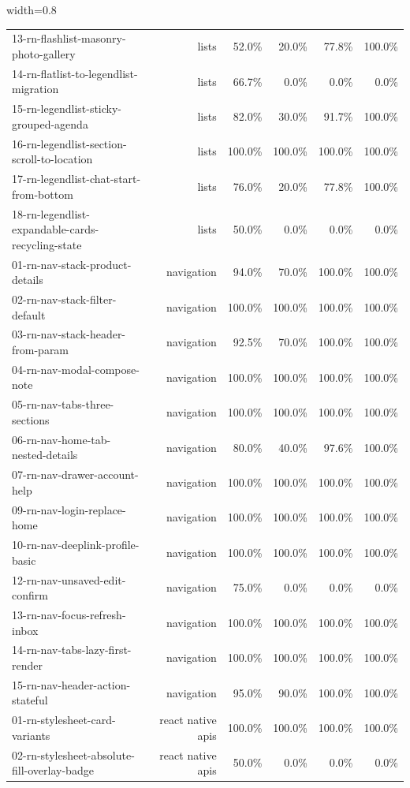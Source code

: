 \begin{table}[htbp]
\begin{adjustbox}{width=0.8\textwidth}
\begin{tabular}{lrrrrr}
13-rn-flashlist-masonry-photo-gallery & lists & 52.0\% & 20.0\% & 77.8\% & 100.0\% \\
14-rn-flatlist-to-legendlist-migration & lists & 66.7\% & 0.0\% & 0.0\% & 0.0\% \\
15-rn-legendlist-sticky-grouped-agenda & lists & 82.0\% & 30.0\% & 91.7\% & 100.0\% \\
16-rn-legendlist-section-scroll-to-location & lists & 100.0\% & 100.0\% & 100.0\% & 100.0\% \\
17-rn-legendlist-chat-start-from-bottom & lists & 76.0\% & 20.0\% & 77.8\% & 100.0\% \\
18-rn-legendlist-expandable-cards-recycling-state & lists & 50.0\% & 0.0\% & 0.0\% & 0.0\% \\
01-rn-nav-stack-product-details & navigation & 94.0\% & 70.0\% & 100.0\% & 100.0\% \\
02-rn-nav-stack-filter-default & navigation & 100.0\% & 100.0\% & 100.0\% & 100.0\% \\
03-rn-nav-stack-header-from-param & navigation & 92.5\% & 70.0\% & 100.0\% & 100.0\% \\
04-rn-nav-modal-compose-note & navigation & 100.0\% & 100.0\% & 100.0\% & 100.0\% \\
05-rn-nav-tabs-three-sections & navigation & 100.0\% & 100.0\% & 100.0\% & 100.0\% \\
06-rn-nav-home-tab-nested-details & navigation & 80.0\% & 40.0\% & 97.6\% & 100.0\% \\
07-rn-nav-drawer-account-help & navigation & 100.0\% & 100.0\% & 100.0\% & 100.0\% \\
09-rn-nav-login-replace-home & navigation & 100.0\% & 100.0\% & 100.0\% & 100.0\% \\
10-rn-nav-deeplink-profile-basic & navigation & 100.0\% & 100.0\% & 100.0\% & 100.0\% \\
12-rn-nav-unsaved-edit-confirm & navigation & 75.0\% & 0.0\% & 0.0\% & 0.0\% \\
13-rn-nav-focus-refresh-inbox & navigation & 100.0\% & 100.0\% & 100.0\% & 100.0\% \\
14-rn-nav-tabs-lazy-first-render & navigation & 100.0\% & 100.0\% & 100.0\% & 100.0\% \\
15-rn-nav-header-action-stateful & navigation & 95.0\% & 90.0\% & 100.0\% & 100.0\% \\
01-rn-stylesheet-card-variants & react native apis & 100.0\% & 100.0\% & 100.0\% & 100.0\% \\
02-rn-stylesheet-absolute-fill-overlay-badge & react native apis & 50.0\% & 0.0\% & 0.0\% & 0.0\% \\

\end{tabular}
\end{adjustbox}
\end{table}
